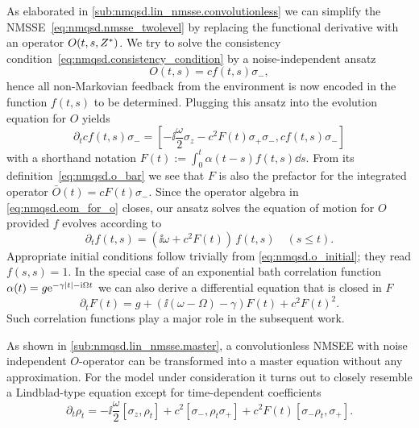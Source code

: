 As elaborated in \autoref{sub:nmqsd.lin_nmsse.convolutionless} we can simplify the NMSSE~\ref{eq:nmqsd.nmsse_twolevel} by replacing the functional derivative with an operator $O(t, s, {Z}^*)$.
We try to solve the consistency condition~\ref{eq:nmqsd.consistency_condition} by a noise-independent ansatz
\begin{equation}
  O(t, s) = c f(t, s) \sigma_-,
  \label{eq:nmqsd.o_ansatz}
\end{equation}
hence all non-Markovian feedback from the environment is now encoded in the function $f(t, s)$ to be determined.
Plugging this ansatz into the evolution equation for $O$ yields
\begin{equation}
  \partial_t c f(t, s) \sigma_- = \left[-\ii \frac{\omega}{2} \sigma_z - c^2 F(t) \sigma_+\sigma_-, c f(t, s) \sigma_-\right]
  \label{eq:nmqsd.eom_for_o}
\end{equation}
with a shorthand notation $F(t) := \int_0^t \alpha(t-s) f(t, s) \dd s$.
From its definition~\ref{eq:nmqsd.o_bar} we see that $F$ is also the prefactor for the integrated operator $\bar O(t) = c F(t) \sigma_-$.
Since the operator algebra in \autoref{eq:nmqsd.eom_for_o} closes, our ansatz solves the equation of motion for $O$ provided $f$ evolves according to
\begin{equation*}
  \partial_t f(t, s) = \left(\ii \omega + c^2 F(t)\right) \, f(t, s) \quad (s \le t).
\end{equation*}
Appropriate initial conditions follow trivially from \autoref{eq:nmqsd.o_initial}; they read $f(s, s) = 1$.
In the special case of an exponential bath correlation function $\alpha(t) = g \exp[-\gamma\abs{t} - \ii\Omega t]$ we can also derive a differential equation that is closed in $F$
\begin{equation*}
  \partial_t F(t) = g + (\ii (\omega - \Omega) - \gamma) F(t) + c^2 F(t)^2.
\end{equation*}
Such correlation functions play a major role in the subsequent work.

As shown in \autoref{sub:nmqsd.lin_nmsse.master}, a convolutionless NMSEE with noise independent $O$-operator can be transformed into a master equation without any approximation.
For the model under consideration it turns out to closely resemble a Lindblad-type equation except for time-dependent coefficients
\begin{equation*}
  \partial_t \rho_t = -\ii \frac{\omega}{2} [\sigma_z, \rho_t] + c^2 [\sigma_-, \rho_t \sigma_+] + c^2 F(t) [\sigma_- \rho_t, \sigma_+].
  \label{eq:nmqsd.two_level_master}
\end{equation*}


